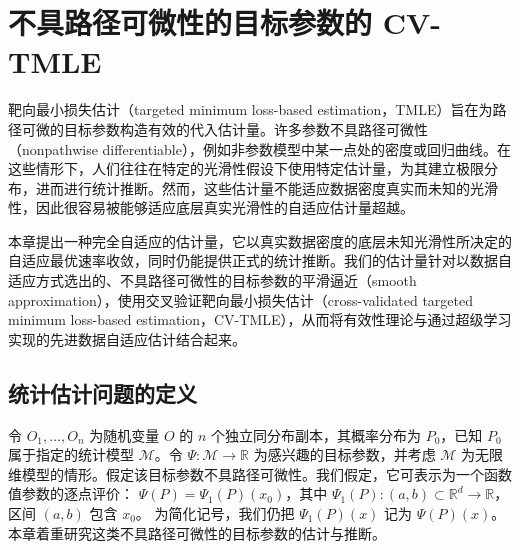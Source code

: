 \chapter{不具路径可微性的目标参数的 CV-TMLE}
\label{ch:nonpathwise-cvtmle}

靶向最小损失估计（targeted minimum loss-based estimation，TMLE）旨在为路径可微的目标参数构造有效的代入估计量。许多参数不具路径可微性（nonpathwise differentiable），例如非参数模型中某一点处的密度或回归曲线。在这些情形下，人们往往在特定的光滑性假设下使用特定估计量，为其建立极限分布，进而进行统计推断。然而，这些估计量不能适应数据密度真实而未知的光滑性，因此很容易被能够适应底层真实光滑性的自适应估计量超越。

\begin{sourcebox}
本章提出一种完全自适应的估计量，它以真实数据密度的底层未知光滑性所决定的自适应最优速率收敛，同时仍能提供正式的统计推断。我们的估计量针对以数据自适应方式选出的、不具路径可微性的目标参数的平滑逼近（smooth approximation），使用交叉验证靶向最小损失估计（cross-validated targeted minimum loss-based estimation，CV-TMLE），从而将有效性理论与通过超级学习实现的先进数据自适应估计结合起来。
\end{sourcebox}

\section{统计估计问题的定义}

令 $O_1,\ldots,O_n$ 为随机变量 $O$ 的 $n$ 个独立同分布副本，其概率分布为 $P_0$，已知 $P_0$ 属于指定的统计模型 $\mathcal M$。令 $\Psi:\mathcal M\to\mathbb R$ 为感兴趣的目标参数，并考虑 $\mathcal M$ 为无限维模型的情形。假定该目标参数不具路径可微性。我们假定，它可表示为一个函数值参数的逐点评价：
$\Psi(P)=\Psi_1(P)(x_0)$，其中
$\Psi_1(P):(a,b)\subset\mathbb R^d\to\mathbb R$，区间 $(a,b)$ 包含 $x_0$。
为简化记号，我们仍把 $\Psi_1(P)(x)$ 记为 $\Psi(P)(x)$。本章着重研究这类不具路径可微性的目标参数的估计与推断。

